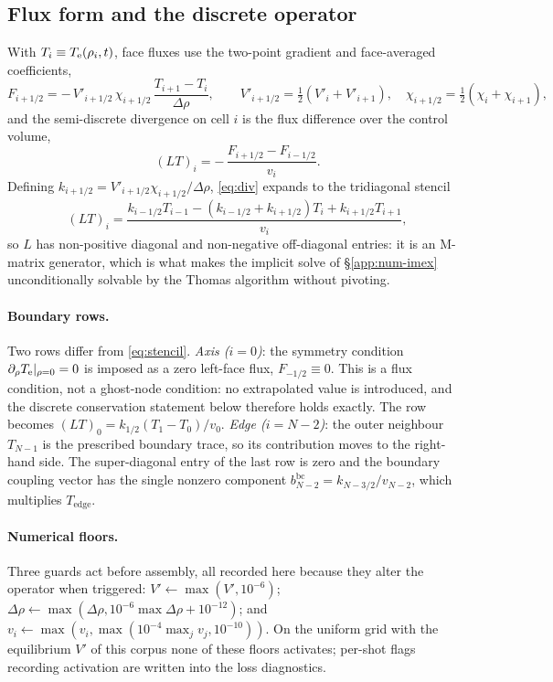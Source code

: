 \subsection{Flux form and the discrete operator}

With $T_i \equiv T_{\mathrm{e}}(\rho_i, t)$, face fluxes use the two-point gradient
and face-averaged coefficients,
\begin{equation}
F_{i+1/2} = -\,V'_{i+1/2}\,\chi_{i+1/2}\,\frac{T_{i+1} - T_i}{\Delta\rho},
\qquad
V'_{i+1/2} = \tfrac12(V'_i + V'_{i+1}),
\quad
\chi_{i+1/2} = \tfrac12(\chi_i + \chi_{i+1}),
\label{eq:faceflux}
\end{equation}
and the semi-discrete divergence on cell $i$ is the flux difference over
the control volume,
\begin{equation}
(L T)_i = -\,\frac{F_{i+1/2} - F_{i-1/2}}{v_i}.
\label{eq:div}
\end{equation}
Defining $k_{i+1/2} = V'_{i+1/2}\chi_{i+1/2}/\Delta\rho$, \eqref{eq:div}
expands to the tridiagonal stencil
\begin{equation}
(L T)_i = \frac{k_{i-1/2} T_{i-1} - (k_{i-1/2} + k_{i+1/2}) T_i + k_{i+1/2} T_{i+1}}{v_i},
\label{eq:stencil}
\end{equation}
so $L$ has non-positive diagonal and non-negative off-diagonal entries: it
is an M-matrix generator, which is what makes the implicit solve of
\S\ref{app:num-imex} unconditionally solvable by the Thomas algorithm
without pivoting.

\paragraph{Boundary rows.} Two rows differ from \eqref{eq:stencil}.
\emph{Axis ($i=0$)}: the symmetry condition
$\partial_\rho T_{\mathrm{e}}|_{\rho=0} = 0$ is imposed as a zero left-face flux,
$F_{-1/2} \equiv 0$. This is a flux condition, not a ghost-node condition:
no extrapolated value is introduced, and the discrete conservation
statement below therefore holds exactly. The row becomes
$(LT)_0 = k_{1/2}(T_1 - T_0)/v_0$.
\emph{Edge ($i=N-2$)}: the outer neighbour $T_{N-1}$ is the prescribed
boundary trace, so its contribution moves to the right-hand side. The
super-diagonal entry of the last row is zero and the boundary coupling
vector has the single nonzero component
$b^{\mathrm{bc}}_{N-2} = k_{N-3/2}/v_{N-2}$, which multiplies
$T_{\mathrm{edge}}$.

\paragraph{Numerical floors.} Three guards act before assembly, all
recorded here because they alter the operator when triggered:
$V' \leftarrow \max(V', 10^{-6})$;
$\Delta\rho \leftarrow \max(\Delta\rho, 10^{-6}\max\Delta\rho + 10^{-12})$;
and $v_i \leftarrow \max(v_i, \max(10^{-4}\max_j v_j, 10^{-10}))$. On the
uniform grid with the equilibrium $V'$ of this corpus none of these floors
activates; per-shot flags recording activation are written into the loss
diagnostics.

